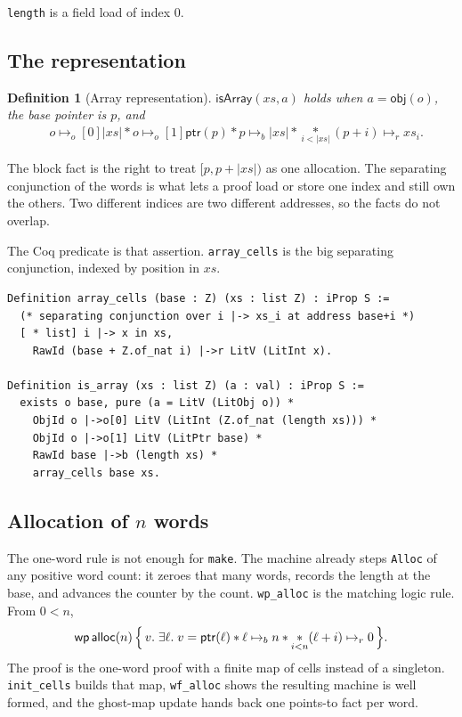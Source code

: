 \documentclass[11pt]{article}
\newtheorem{definition}[theorem]{Definition}
\newcommand{\ptsr}{\mathrel{\mapsto_{r}}}
\newcommand{\ptsb}{\mathrel{\mapsto_{b}}}
\newcommand{\ptso}{\mathrel{\mapsto_{o}}}
\newcommand{\sep}{\mathbin{*}}
\newcommand{\Wpre}{\mathsf{wp}}
\begin{document}
\texttt{length} is a field load of index \(0\).

\subsection{The representation}

\begin{definition}[Array representation]
\(\mathsf{isArray}(xs, a)\) holds when \(a = \mathsf{obj}(o)\), the base pointer is \(p\), and
\[
\begin{aligned}
&o \ptso[0] \lvert xs \rvert
\sep
o \ptso[1] \mathsf{ptr}(p)
\sep
p \ptsb \lvert xs \rvert
\sep
\mathop{\ast}\limits_{i < \lvert xs \rvert}
  (p+i) \ptsr xs_i.
\end{aligned}
\]
\end{definition}

The block fact is the right to treat \([p, p+\lvert xs \rvert)\) as one allocation.
The separating conjunction of the words is what lets a proof load or store one index and still own the others.
Two different indices are two different addresses, so the facts do not overlap.

The Coq predicate is that assertion.
\texttt{array\_cells} is the big separating conjunction, indexed by position in \(xs\).

\begin{lstlisting}
Definition array_cells (base : Z) (xs : list Z) : iProp S :=
  (* separating conjunction over i |-> xs_i at address base+i *)
  [ * list] i |-> x in xs,
    RawId (base + Z.of_nat i) |->r LitV (LitInt x).

Definition is_array (xs : list Z) (a : val) : iProp S :=
  exists o base, pure (a = LitV (LitObj o)) *
    ObjId o |->o[0] LitV (LitInt (Z.of_nat (length xs))) *
    ObjId o |->o[1] LitV (LitPtr base) *
    RawId base |->b (length xs) *
    array_cells base xs.
\end{lstlisting}

\subsection{Allocation of \(n\) words}

The one-word rule is not enough for \texttt{make}.
The machine already steps \texttt{Alloc} of any positive word count: it zeroes that many words, records the length at the base, and advances the counter by the count.
\texttt{wp\_alloc} is the matching logic rule.
From \(0 < n\),
\[
\Wpre\,\mathsf{alloc}(n)
\,\Bigl\{\,v.\;
  \exists \ell.\;
  v = \mathsf{ptr}(\ell)
  \sep
  \ell \ptsb n
  \sep
  \mathop{\ast}\limits_{i < n} (\ell+i) \ptsr 0
\,\Bigr\}.
\]
The proof is the one-word proof with a finite map of cells instead of a singleton.
\texttt{init\_cells} builds that map, \texttt{wf\_alloc} shows the resulting machine is well formed, and the ghost-map update hands back one points-to fact per word.
\end{document}

